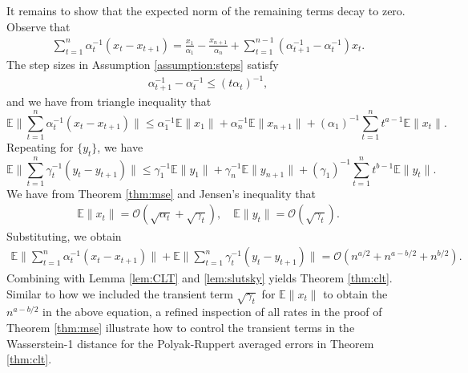 It remains to show that the expected norm of the remaining terms decay to zero.
Observe that 
\begin{align*}
    \sum_{t=1}^n \alpha_t^{-1} (x_t - x_{t+1}) = \frac{x_1}{\alpha_1} - \frac{x_{n+1}}{\alpha_{n}} + \sum_{t=1}^{n-1} (\alpha_{t+1}^{-1} - \alpha_{t}^{-1}) x_t .
\end{align*}
The step sizes in Assumption \ref{assumption:steps} satisfy
\begin{align*}
    \alpha_{t+1}^{-1} - \alpha_{t}^{-1} \leq (t \alpha_t)^{-1} ,
\end{align*}
and we have from triangle inequality that
\begin{equation}\label{eq:fast_telescope}
    \mathbb{E} \lVert \sum_{t=1}^n \alpha_t^{-1} (x_t - x_{t+1}) \rVert \leq \alpha_1^{-1} \mathbb{E}\lVert x_1 \rVert  + \alpha_n^{-1} \mathbb{E}\lVert x_{n+1} \rVert + (\alpha_1)^{-1} \sum_{t=1}^n t^{a - 1} \mathbb{E} \lVert  x_t \rVert .
\end{equation}
Repeating for $\{y_t\}$, we have
\begin{equation}\label{eq:slow_telescope}
    \mathbb{E} \lVert \sum_{t=1}^n \gamma_t^{-1} (y_t - y_{t+1}) \rVert \leq \gamma_1^{-1} \mathbb{E} \lVert y_1 \rVert + \gamma_n^{-1} \mathbb{E} \lVert y_{n+1} \rVert + (\gamma_1)^{-1} \sum_{t=1}^n t^{b - 1} \mathbb{E} \lVert  y_t \rVert .
\end{equation}
We have from Theorem \ref{thm:mse} and Jensen's inequality that
\begin{align*}
    \mathbb{E}\lVert x_{t} \rVert = \mathcal{O}(\sqrt{\alpha_t} + \sqrt{\gamma_t}), 
    \quad 
    \mathbb{E} \lVert y_{t} \rVert = \mathcal{O}(\sqrt{\gamma_t}) .
\end{align*}
Substituting, we obtain
\begin{align*}
    \mathbb{E} \lVert \sum_{t=1}^n \alpha_t^{-1} (x_t - x_{t+1}) \rVert + \mathbb{E}\lVert \sum_{t=1}^n \gamma_t^{-1} (y_t - y_{t+1}) \rVert 
    = \mathcal{O}\left(n^{a/2} + n^{a-b/2} + n^{b/2}\right) .
\end{align*}
Combining with Lemma \ref{lem:CLT} and \ref{lem:slutsky} yields Theorem \ref{thm:clt}.
Similar to how we included the transient term $\sqrt{\gamma_t}$ for $\mathbb{E}\lVert x_t\rVert$ to obtain the $n^{a-b/2}$ in the above equation, a refined inspection of all rates in the proof of Theorem \ref{thm:mse} illustrate how to control the transient terms in the Wasserstein-1 distance for the Polyak-Ruppert averaged errors in Theorem \ref{thm:clt}. 


